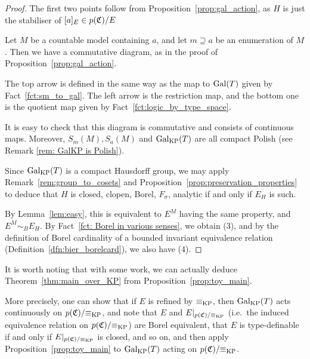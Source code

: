 	\begin{proof}
		The first two points follow from Proposition~\ref{prop:gal_action}, as $H$ is just the stabiliser of $[a]_E\in p({\mathfrak C})/E$
		
		Let $M$ be a countable model containing $a$, and let $m\supseteq a$ be an enumeration of $M$. Then we have a commutative diagram, as in the proof of Proposition~\ref{prop:gal_action}.
		\begin{center}
		\end{center}
		The top arrow is defined in the same way as the map to $\operatorname{{Gal}}(T)$ given by Fact~\ref{fct:sm_to_gal}. The left arrow is the restriction map, and the bottom one is the quotient map given by Fact~\ref{fct:logic_by_type_space}.
		
		It is easy to check that this diagram is commutative and consists of continuous maps. Moreover, $S_m(M), S_a(M)$ and $\operatorname{{Gal}}_{\mathrm{KP}}(T)$ are all compact Polish (see Remark \ref{rem: GalKP is Polish}).
		
		Since $\operatorname{{Gal}}_{\mathrm{KP}}(T)$ is a compact Hausdorff group, we may apply Remark~\ref{rem:group_to_cosets} and Proposition~\ref{prop:preservation_properties} to deduce that $H$ is closed, clopen, Borel, $F_\sigma$, analytic if and only if $E_H$ is such.
		
		By Lemma~\ref{lem:easy}, this is equivalent to $E^M$ having the same property, and $E^M\sim_B E_H$. By Fact~\ref{fct: Borel in various senses}, we obtain (3), and by the definition of Borel cardinality of a bounded invariant equivalence relation (Definition~\ref{dfn:bier_borelcard}), we also have (4).
	\end{proof}
	
	
	It is worth noting that with some work, we can actually deduce Theorem~\ref{thm:main_over_KP} from Proposition~\ref{prop:toy_main}.
	
	More precisely, one can show that if $E$ is refined by $\equiv_{\mathrm{KP}}$, then $\operatorname{{Gal}}_{\mathrm{KP}}(T)$ acts continuously on $p({\mathfrak C})/{\equiv_{\mathrm{KP}}}$, and note that $E$ and $E|_{p({\mathfrak C})/{\equiv_{\mathrm{KP}}}}$ (i.e.\ the induced equivalence relation on ${p({\mathfrak C})/{\equiv_{\mathrm{KP}}}}$) are Borel equivalent, that $E$ is type-definable if and only if $E|_{p({\mathfrak C})/{\equiv_{\mathrm{KP}}}}$ is closed, and so on, and then apply Proposition~\ref{prop:toy_main} to $\operatorname{{Gal}}_{\mathrm{KP}}(T)$ acting on $p({\mathfrak C})/{\equiv_{\mathrm{KP}}}$.
	
